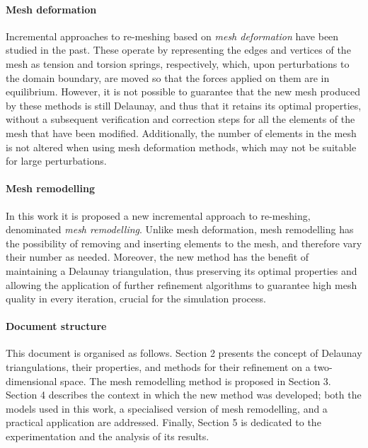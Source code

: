 \paragraph{Mesh deformation} Incremental approaches to re-meshing based on \textit{mesh deformation} have been studied in the past. These operate by representing the edges and vertices of the mesh as tension and torsion springs, respectively, which, upon perturbations to the domain boundary, are moved so that the forces applied on them are in equilibrium. However, it is not possible to guarantee that the new mesh produced by these methods is still Delaunay, and thus that it retains its optimal properties, without a subsequent verification and correction steps for all the elements of the mesh that have been modified. Additionally, the number of elements in the mesh is not altered when using mesh deformation methods, which may not be suitable for large perturbations.

\paragraph{Mesh remodelling} In this work it is proposed a new incremental approach to re-meshing, denominated \textit{mesh remodelling}. Unlike mesh deformation, mesh remodelling has the possibility of removing and inserting elements to the mesh, and therefore vary their number as needed. Moreover, the new method has the benefit of maintaining a Delaunay triangulation, thus preserving its optimal properties and allowing the application of further refinement algorithms to guarantee high mesh quality in every iteration, crucial for the simulation process.

\paragraph{Document structure} This document is organised as follows. Section 2 presents the concept of Delaunay triangulations, their properties, and methods for their refinement on a two-dimensional space. The mesh remodelling method is proposed in Section 3. Section 4 describes the context in which the new method was developed; both the models used in this work, a specialised version of mesh remodelling, and a practical application are addressed. Finally, Section 5 is dedicated to the experimentation and the analysis of its results.